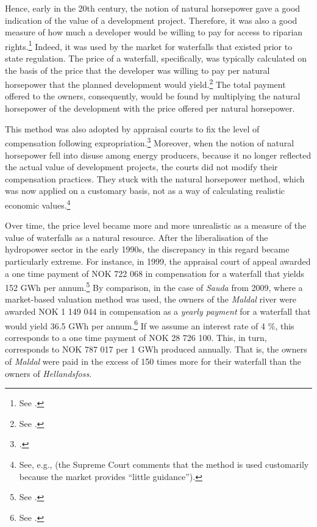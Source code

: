 Hence, early in the 20th century, the notion of natural horsepower gave a good indication of the value of a development project. Therefore, it was also a good measure of how much a developer would be willing to pay for access to riparian rights.\footnote{See \cite[83]{uleberg08}.} Indeed, it was used by the market for waterfalls that existed prior to state regulation. The price of a waterfall, specifically, was typically calculated on the basis of the price that the developer was willing to pay per natural horsepower that the planned development would yield.\footnote{See \cite[83]{uleberg08}.} The total payment offered to the owners, consequently, would be found by multiplying the natural horsepower of the development with the price offered per natural horsepower.

This method was also adopted by appraisal courts to fix the level of compensation following expropriation.\footnote{\cite[521]{vislie02}.} Moreover, when the notion of natural horsepower fell into disuse among energy producers, because it no longer reflected the actual value of development projects, the courts did not modify their compensation practices. They stuck with the natural horsepower method, which was now applied on a customary basis, not as a way of calculating realistic economic values.\footnote{See, e.g., \cite[1599]{hellandsfoss99} (the Supreme Court comments that the method is used customarily because the market provides ``little guidance'').} %

Over time, the price level became more and more unrealistic as a measure of the value of waterfalls as a natural resource. After the liberalisation of the hydropower sector in the early 1990s, the discrepancy in this regard became particularly extreme. For instance, in 1999, the appraisal court of appeal awarded a one time payment of NOK 722 068 in compensation for a waterfall that yields 152 GWh per annum.\footnote{See \cite{hellandsfoss99}.} By comparison, in the case of {\it Sauda} from 2009, where a market-based valuation method was used, the owners of the {\it Maldal} river were awarded NOK 1 149 044 in compensation as a {\it yearly payment} for a waterfall that would yield 36.5 GWh per annum.\footnote{See \cite{sauda09}.} If we assume an interest rate of 4 \%, this corresponds to a one time payment of NOK 28 726 100. This, in turn, corresponds to NOK 787 017 per 1 GWh produced annually. That is, the owners of {\it Maldal} were paid in the excess of 150 times more for their waterfall than the owners of {\it Hellandsfoss}.

